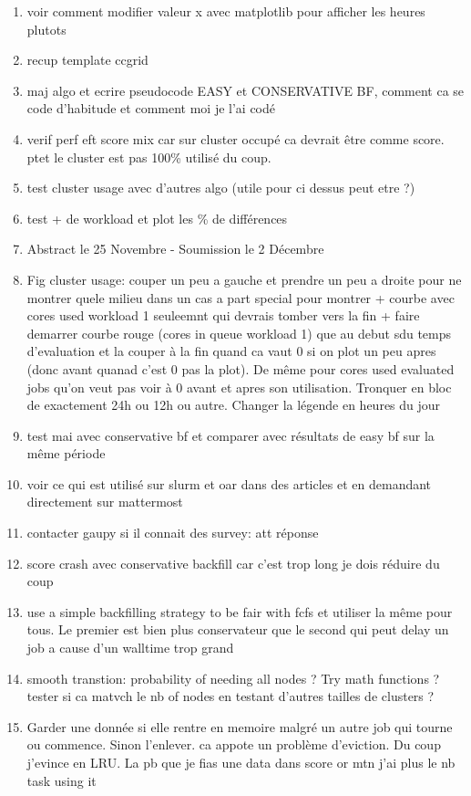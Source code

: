 \documentclass[a4paper]{article}
\begin{document}
\begin{enumerate}
			\item voir comment modifier valeur x avec matplotlib pour afficher les heures plutots
			\item recup template ccgrid
			\item maj algo et ecrire pseudocode EASY et CONSERVATIVE BF, comment ca se code d'habitude et comment moi je l'ai codé
			\item verif perf eft score mix car sur cluster occupé ca devrait être comme score. ptet le cluster est pas 100\% utilisé du coup.
			\item test cluster usage avec d'autres algo (utile pour ci dessus peut etre ?)
			\item test + de workload et plot les \% de différences
			\item Abstract le 25 Novembre - Soumission le 2 Décembre
			\item Fig cluster usage: couper un peu a gauche et prendre un peu a droite pour ne montrer quele milieu dans un cas a part special pour montrer + courbe avec cores used workload 1 seuleemnt qui devrais tomber vers la fin + faire demarrer courbe rouge (cores in queue workload 1) que au debut sdu temps d'evaluation et la couper à la fin quand ca vaut 0 si on plot un peu apres (donc avant quanad c'est 0 pas la plot). De même pour cores used evaluated jobs qu'on veut pas voir à 0 avant et apres son utilisation. Tronquer en bloc de exactement 24h ou 12h ou autre. Changer la légende en heures du jour 
			
			
			\item test mai avec conservative bf et comparer avec résultats de easy bf sur la même période
			\item voir ce qui est utilisé sur slurm et oar dans des articles et en demandant directement sur mattermost
			\item contacter gaupy si il connait des survey: att réponse
			
			\item score crash avec conservative backfill car c'est trop long je dois réduire du coup
		
			\item use a simple backfilling strategy to be fair with fcfs et utiliser la même pour tous. Le premier est bien plus conservateur que le second qui peut delay un job a cause d'un walltime trop grand
			\item smooth transtion: probability of needing all nodes ? Try math functions ? tester si ca matvch le nb of nodes en testant d'autres tailles de clusters ?
			\item Garder une donnée si elle rentre en memoire malgré un autre job qui tourne ou commence. Sinon l'enlever. ca appote un problème d'eviction. Du coup j'evince en LRU. La pb que je fias une data dans score or mtn j'ai plus le nb task using it
		

\end{enumerate}
\end{document}
